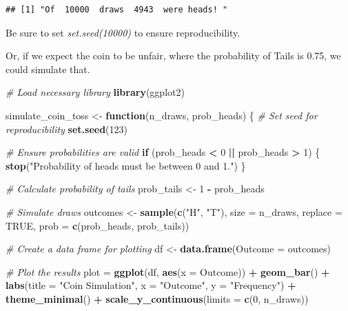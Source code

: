 \documentclass[
]{book}
\newenvironment{Shaded}{\begin{snugshade}}{\end{snugshade}}
\newcommand{\AttributeTok}[1]{\textcolor[rgb]{0.13,0.29,0.53}{#1}}
\newcommand{\CommentTok}[1]{\textcolor[rgb]{0.56,0.35,0.01}{\textit{#1}}}
\newcommand{\ConstantTok}[1]{\textcolor[rgb]{0.56,0.35,0.01}{#1}}
\newcommand{\ControlFlowTok}[1]{\textcolor[rgb]{0.13,0.29,0.53}{\textbf{#1}}}
\newcommand{\DecValTok}[1]{\textcolor[rgb]{0.00,0.00,0.81}{#1}}
\newcommand{\FunctionTok}[1]{\textcolor[rgb]{0.13,0.29,0.53}{\textbf{#1}}}
\newcommand{\NormalTok}[1]{#1}
\newcommand{\OtherTok}[1]{\textcolor[rgb]{0.56,0.35,0.01}{#1}}
\newcommand{\SpecialCharTok}[1]{\textcolor[rgb]{0.81,0.36,0.00}{\textbf{#1}}}
\newcommand{\StringTok}[1]{\textcolor[rgb]{0.31,0.60,0.02}{#1}}
\begin{document}
\begin{verbatim}
## [1] "Of  10000  draws  4943  were heads! "
\end{verbatim}

Be sure to set \emph{set.seed(10000)} to ensure reproducibility.

Or, if we expect the coin to be unfair, where the probability of Tails is 0.75, we could simulate that.

\begin{Shaded}
\begin{Highlighting}[]
\CommentTok{\# Load necessary library}
\FunctionTok{library}\NormalTok{(ggplot2)}

\NormalTok{simulate\_coin\_toss }\OtherTok{\textless{}{-}} \ControlFlowTok{function}\NormalTok{(n\_draws, prob\_heads) \{}
  \CommentTok{\# Set seed for reproducibility}
  \FunctionTok{set.seed}\NormalTok{(}\DecValTok{123}\NormalTok{)}

  \CommentTok{\# Ensure probabilities are valid}
  \ControlFlowTok{if}\NormalTok{ (prob\_heads }\SpecialCharTok{\textless{}} \DecValTok{0} \SpecialCharTok{||}\NormalTok{ prob\_heads }\SpecialCharTok{\textgreater{}} \DecValTok{1}\NormalTok{) \{}
    \FunctionTok{stop}\NormalTok{(}\StringTok{"Probability of heads must be between 0 and 1."}\NormalTok{)}
\NormalTok{  \}}

  \CommentTok{\# Calculate probability of tails}
\NormalTok{  prob\_tails }\OtherTok{\textless{}{-}} \DecValTok{1} \SpecialCharTok{{-}}\NormalTok{ prob\_heads}

  \CommentTok{\# Simulate draws}
\NormalTok{  outcomes }\OtherTok{\textless{}{-}} \FunctionTok{sample}\NormalTok{(}\FunctionTok{c}\NormalTok{(}\StringTok{"H"}\NormalTok{, }\StringTok{"T"}\NormalTok{), }\AttributeTok{size =}\NormalTok{ n\_draws, }\AttributeTok{replace =} \ConstantTok{TRUE}\NormalTok{, }
                     \AttributeTok{prob =} \FunctionTok{c}\NormalTok{(prob\_heads, prob\_tails))}

  \CommentTok{\# Create a data frame for plotting}
\NormalTok{  df }\OtherTok{\textless{}{-}} \FunctionTok{data.frame}\NormalTok{(}\AttributeTok{Outcome =}\NormalTok{ outcomes)}

  \CommentTok{\# Plot the results}
\NormalTok{  plot }\OtherTok{=} \FunctionTok{ggplot}\NormalTok{(df, }\FunctionTok{aes}\NormalTok{(}\AttributeTok{x =}\NormalTok{ Outcome)) }\SpecialCharTok{+}
    \FunctionTok{geom\_bar}\NormalTok{() }\SpecialCharTok{+}
    \FunctionTok{labs}\NormalTok{(}\AttributeTok{title =} \StringTok{"Coin Simulation"}\NormalTok{, }\AttributeTok{x =} \StringTok{"Outcome"}\NormalTok{, }\AttributeTok{y =} \StringTok{"Frequency"}\NormalTok{) }\SpecialCharTok{+}
    \FunctionTok{theme\_minimal}\NormalTok{() }\SpecialCharTok{+}
    \FunctionTok{scale\_y\_continuous}\NormalTok{(}\AttributeTok{limits =} \FunctionTok{c}\NormalTok{(}\DecValTok{0}\NormalTok{, n\_draws))}


\end{Highlighting}
\end{Shaded}
\end{document}
